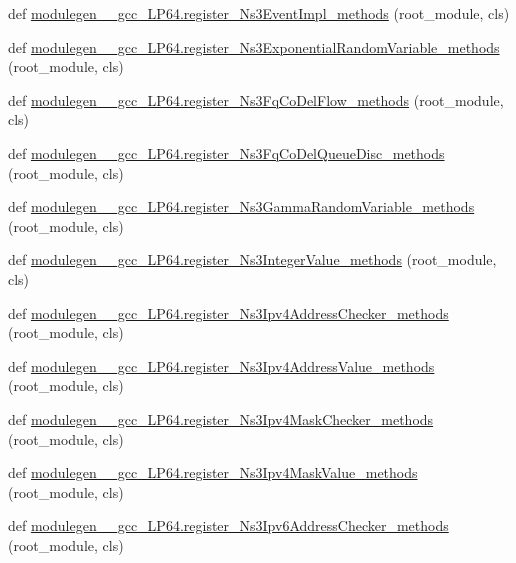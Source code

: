 \begin{DoxyCompactItemize}
\item 
def \hyperlink{namespacemodulegen____gcc__LP64_af4f20b1c5907e07b645fc3d57c733d1a}{modulegen\+\_\+\+\_\+gcc\+\_\+\+L\+P64.\+register\+\_\+\+Ns3\+Event\+Impl\+\_\+methods} (root\+\_\+module, cls)
\item 
def \hyperlink{namespacemodulegen____gcc__LP64_ab62699a984e734ed1c1a4081daa0111d}{modulegen\+\_\+\+\_\+gcc\+\_\+\+L\+P64.\+register\+\_\+\+Ns3\+Exponential\+Random\+Variable\+\_\+methods} (root\+\_\+module, cls)
\item 
def \hyperlink{namespacemodulegen____gcc__LP64_a65758bd5091f5f547900414d7e4cfb97}{modulegen\+\_\+\+\_\+gcc\+\_\+\+L\+P64.\+register\+\_\+\+Ns3\+Fq\+Co\+Del\+Flow\+\_\+methods} (root\+\_\+module, cls)
\item 
def \hyperlink{namespacemodulegen____gcc__LP64_a5d57964880eee6b22ba706d6ee94e0fb}{modulegen\+\_\+\+\_\+gcc\+\_\+\+L\+P64.\+register\+\_\+\+Ns3\+Fq\+Co\+Del\+Queue\+Disc\+\_\+methods} (root\+\_\+module, cls)
\item 
def \hyperlink{namespacemodulegen____gcc__LP64_afc8093c1b272f8c4c4280ae9730cc32c}{modulegen\+\_\+\+\_\+gcc\+\_\+\+L\+P64.\+register\+\_\+\+Ns3\+Gamma\+Random\+Variable\+\_\+methods} (root\+\_\+module, cls)
\item 
def \hyperlink{namespacemodulegen____gcc__LP64_ab05afb2ecfb81af7b17cc3baf06fce54}{modulegen\+\_\+\+\_\+gcc\+\_\+\+L\+P64.\+register\+\_\+\+Ns3\+Integer\+Value\+\_\+methods} (root\+\_\+module, cls)
\item 
def \hyperlink{namespacemodulegen____gcc__LP64_adc0fd34fe5054bad708a40699ec19c68}{modulegen\+\_\+\+\_\+gcc\+\_\+\+L\+P64.\+register\+\_\+\+Ns3\+Ipv4\+Address\+Checker\+\_\+methods} (root\+\_\+module, cls)
\item 
def \hyperlink{namespacemodulegen____gcc__LP64_a790c617791e5a0c735de031e06684232}{modulegen\+\_\+\+\_\+gcc\+\_\+\+L\+P64.\+register\+\_\+\+Ns3\+Ipv4\+Address\+Value\+\_\+methods} (root\+\_\+module, cls)
\item 
def \hyperlink{namespacemodulegen____gcc__LP64_a2a6820145ab3bf977a66f5c0ee7f5cb9}{modulegen\+\_\+\+\_\+gcc\+\_\+\+L\+P64.\+register\+\_\+\+Ns3\+Ipv4\+Mask\+Checker\+\_\+methods} (root\+\_\+module, cls)
\item 
def \hyperlink{namespacemodulegen____gcc__LP64_abcaf7e9c479182a07e377ce5e986a998}{modulegen\+\_\+\+\_\+gcc\+\_\+\+L\+P64.\+register\+\_\+\+Ns3\+Ipv4\+Mask\+Value\+\_\+methods} (root\+\_\+module, cls)
\item 
def \hyperlink{namespacemodulegen____gcc__LP64_ad1f9cec8b591983bb09444b16062156d}{modulegen\+\_\+\+\_\+gcc\+\_\+\+L\+P64.\+register\+\_\+\+Ns3\+Ipv6\+Address\+Checker\+\_\+methods} (root\+\_\+module, cls)

\end{DoxyCompactItemize}
